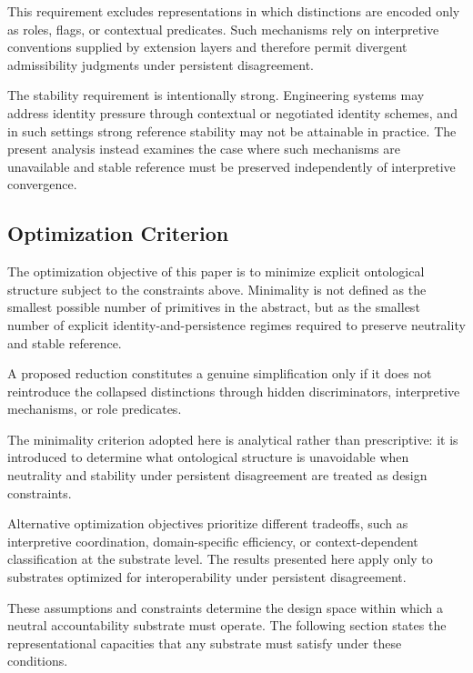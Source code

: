 This requirement excludes representations in which \stabilitycritical{}
distinctions are encoded only as roles, flags, or contextual predicates.
Such mechanisms rely on interpretive conventions supplied by extension layers
and therefore permit divergent admissibility judgments under persistent
disagreement.

The stability requirement is intentionally strong.
Engineering systems may address identity pressure through contextual
or negotiated identity schemes, and in such settings strong reference
stability may not be attainable in practice.
The present analysis instead examines the case
where such mechanisms are unavailable and
stable reference must be preserved independently of interpretive convergence.

\subsection{Optimization Criterion}

The optimization objective of this paper is to minimize explicit ontological
structure subject to the constraints above.
Minimality is not defined as
the smallest possible number of primitives in the abstract,
but as the smallest number of explicit identity-and-persistence
regimes required to preserve neutrality and stable reference.

A proposed reduction constitutes a genuine simplification only if it does not
reintroduce the collapsed distinctions through hidden discriminators,
interpretive mechanisms, or role predicates.

The minimality criterion adopted here is analytical rather than prescriptive:
it is introduced to determine what ontological structure
is unavoidable when neutrality and stability under persistent disagreement
are treated as design constraints.

Alternative optimization objectives prioritize different tradeoffs, such as
interpretive coordination, domain-specific efficiency, or context-dependent
classification at the substrate level.
The results presented here apply only to substrates optimized for
interoperability under persistent disagreement.

These assumptions and constraints determine the design space
within which a neutral accountability substrate must operate.
The following section states the representational capacities that any
substrate must satisfy under these conditions.
